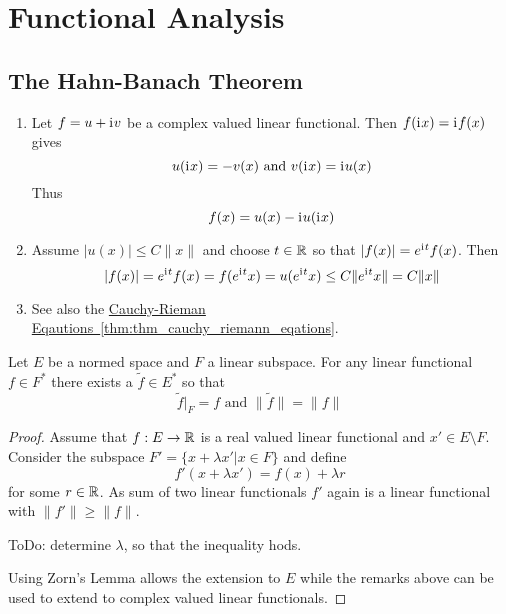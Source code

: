 \newpage
\section{Functional Analysis}

\subsection{The Hahn-Banach Theorem}

\begin{remarks}
    \hfill
    \begin{enumerate}
        \item Let \( f = u + \mathrm{i}\mkern1mu v\) be a complex valued linear functional.
              Then \( f(\mathrm{i}\mkern1mu x) = \mathrm{i}\mkern1mu f(x) \) gives
              \[
                  u(\mathrm{i}\mkern1mu x) = -v(x) \text{ and } v(\mathrm{i}\mkern1mu x) = \mathrm{i}\mkern1mu u(x)
              \]
              Thus
              \[
                  f(x) = u(x) - \mathrm{i}\mkern1mu u(\mathrm{i}\mkern1mu x)
              \]
        \item Assume \( |u(x)| \le C\|x\| \) and choose \( t \in \mathbb{R} \) so that \( |f(x)| = e^{\mathrm{i}\mkern1mu t}f(x) \).
              Then
              \[
                  |f(x)| = e^{\mathrm{i}\mkern1mu t}f(x) = f(e^{\mathrm{i}\mkern1mu t}x) = u(e^{\mathrm{i}\mkern1mu t}x) \le C\|e^{\mathrm{i}\mkern1mu t}x\| = C\|x\|
              \]
        \item
              See also the \hyperref[thm:thm_cauchy_riemann_eqations]{Cauchy-Rieman 
              Eqautions~\ref*{thm:thm_cauchy_riemann_eqations}}.
    \end{enumerate}
\end{remarks}
\bigskip


\begin{theorem}\label{thm:hahn_banach}
    Let \( E \) be a normed space and \( F \) a linear subspace. For any linear functional
    \( f \in F^* \) there exists a \( \tilde{f} \in E^* \) so that
    \[
        \tilde{f}|_F = f \text{ and } \|\tilde{f}\| = \|f\|
    \]
\end{theorem}

\begin{proof}
    Assume that \( f: E \to \mathbb{R} \) is a real valued linear functional and \( x' \in E \setminus F \).
    Consider the subspace \( F' = \{x + \lambda x' | x \in F \} \) and define
    \[
        f'(x + \lambda x') = f(x) + \lambda r
    \]
    for some \( r \in \mathbb{R} \).  As sum of two linear functionals \( f' \) again is a linear functional with
    \( \|f'\| \ge \|f\| \).

    ToDo: determine \( \lambda \), so that the inequality hods.

    Using Zorn's Lemma allows the extension to \( E \) while the remarks above can be used to extend
    to complex valued linear functionals.
\end{proof}
\bigskip


